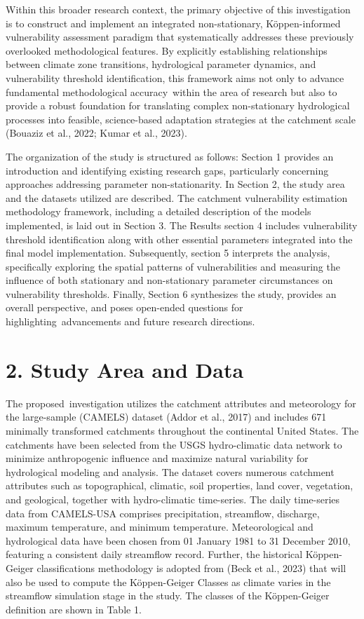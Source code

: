 \documentclass[
]{article}
\begin{document}
Within this broader research context, the primary objective of this
investigation is to construct and implement an integrated
non-stationary, Köppen-informed vulnerability assessment paradigm that
systematically addresses these previously overlooked methodological
features. By explicitly establishing relationships between climate zone
transitions, hydrological parameter dynamics, and vulnerability
threshold identification, this framework aims not only to advance
fundamental methodological accuracy~within the area of research but also
to provide a robust foundation for translating complex non-stationary
hydrological processes into feasible, science-based adaptation
strategies at the catchment scale (Bouaziz et al., 2022; Kumar et al.,
2023).

The organization of the study is structured as follows: Section 1
provides an introduction and identifying existing research gaps,
particularly concerning approaches addressing parameter
non-stationarity. In Section 2, the study area and the datasets utilized
are described. The catchment vulnerability estimation methodology
framework, including a detailed description of the models implemented,
is laid out in Section 3. The Results section 4 includes vulnerability
threshold identification along with other essential parameters
integrated into the final model implementation. Subsequently, section 5
interprets the analysis, specifically exploring the spatial patterns of
vulnerabilities and measuring the influence of both stationary and
non-stationary parameter circumstances on vulnerability thresholds.
Finally, Section 6 synthesizes the study, provides an overall
perspective, and poses open-ended questions for
highlighting~advancements and future research directions.

\section{2. Study Area and Data}\label{study-area-and-data}

The proposed~investigation utilizes the catchment attributes and
meteorology for the large-sample (CAMELS) dataset (Addor et al., 2017)
and includes 671 minimally transformed catchments throughout the
continental United States. The catchments have been selected from the
USGS hydro-climatic data network to minimize anthropogenic influence and
maximize natural variability for hydrological modeling and analysis. The
dataset covers numerous catchment attributes such as topographical,
climatic, soil properties, land cover, vegetation, and geological,
together with hydro-climatic time-series. The daily time-series data
from CAMELS-USA comprises precipitation, streamflow, discharge, maximum
temperature, and minimum temperature. Meteorological and hydrological
data have been chosen from 01 January 1981 to 31 December 2010,
featuring a consistent daily streamflow record. Further, the historical
Köppen-Geiger classifications methodology is adopted from (Beck et al.,
2023) that will also be used to compute the Köppen-Geiger Classes as
climate varies in the streamflow simulation stage in the study. The
classes of the Köppen-Geiger definition are shown in Table 1.
\end{document}
